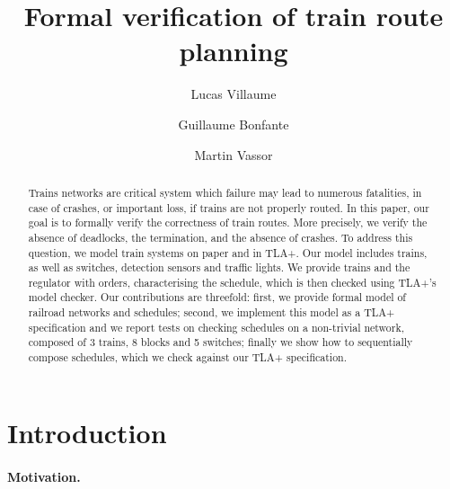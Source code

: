 \documentclass[runningheads]{llncs}
\begin{document}
%
\title{Formal verification of train route planning}
%
%
\author{Lucas Villaume \and Guillaume Bonfante \and Martin Vassor}
%
%
%
\maketitle
%
\begin{abstract}
	Trains networks are critical system which failure may lead to numerous fatalities, in case of crashes, or important loss, if trains are not properly routed. 
	In this paper, our goal is to formally verify the correctness of train routes. More precisely, we verify the absence of deadlocks, the termination, and the absence of crashes.
	To address this question, we model train systems on paper and in TLA+. Our model includes trains, as well as switches, detection sensors and traffic lights. 
	We provide trains and the regulator with orders, characterising the schedule, which is then checked using TLA+'s model checker.
	Our contributions are threefold: first, we provide formal model of railroad networks and schedules; second, we implement this model as a TLA+ specification and we report tests on checking schedules on a non-trivial network, composed of 3 trains, 8 blocks and 5 switches; finally we show how to sequentially compose schedules, which we check against our TLA+ specification.

\end{abstract}


\section{Introduction}
\label{sec:introduction}
\paragraph{Motivation.}
\end{document}
